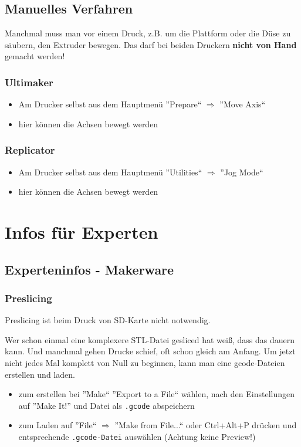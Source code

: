 \documentclass{\basedir/fablab-document}
\begin{document}
\subsection{Manuelles Verfahren}\label{manuelles-verfahren}
Manchmal muss man vor einem Druck, z.B. um die Plattform oder die Düse zu säubern, den Extruder bewegen.
Das darf bei beiden Druckern \textbf{nicht von Hand} gemacht werden!

\subsubsection{Ultimaker}
\begin{itemize}
	\item Am Drucker selbst aus dem Hauptmenü ''Prepare`` $\Rightarrow$ ''Move Axis``
	\item hier können die Achsen bewegt werden
\end{itemize}

\subsubsection{Replicator}
\begin{itemize}
 \item Am Drucker selbst aus dem Hauptmenü ''Utilities`` $\Rightarrow$ ''Jog Mode``
 \item hier können die Achsen bewegt werden
\end{itemize}

\section{Infos für Experten}

\subsection{Experteninfos - Makerware} \label{expinfos}
\subsubsection{Preslicing}
Preslicing ist beim Druck von SD-Karte nicht notwendig.

Wer schon einmal eine komplexere STL-Datei gesliced hat weiß, dass das dauern kann. Und manchmal gehen Drucke schief,
oft schon gleich am Anfang. Um jetzt nicht jedes Mal komplett von Null zu beginnen, kann man eine gcode-Dateien erstellen
und laden.
\begin{itemize}
\item zum erstellen bei ''Make`` ''Export to a File`` wählen, nach den Einstellungen auf ''Make It!'' und Datei als \texttt{.gcode} abspeichern
\item zum Laden auf ''File`` $\Rightarrow$ ''Make from File...`` oder Ctrl+Alt+P drücken und entsprechende \texttt{.gcode-Datei} auswählen (Achtung keine Preview!)
\end{itemize}
\end{document}

